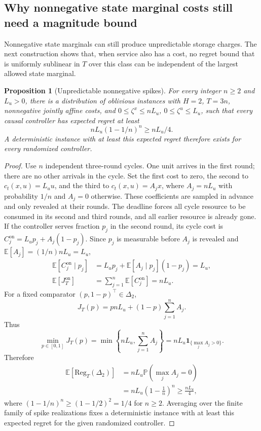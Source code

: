 \documentclass[11pt]{article}
\newcommand{\E}{\mathbb{E}}
\newcommand{\Reg}{\mathrm{Reg}}
\newcommand{\ind}[1]{\mathbf{1}_{\{#1\}}}
\theoremstyle{plain}
\newtheorem{Thm:Proposition}[Thm:Theorem]{Proposition}
\theoremstyle{remark}
\numberwithin{equation}{section}
\begin{document}
\subsection{Why nonnegative state marginal costs still need a magnitude bound}
\label{ch6:subsec:spikes}
Nonnegative state marginals can still produce unpredictable storage
charges. The next construction shows that, when service also has a cost,
no regret bound that is uniformly sublinear in $T$ over this class can be
independent of the largest allowed state marginal.

\begin{Thm:Proposition}[Unpredictable nonnegative spikes]\label{ch6:prop:spikes}
For every integer $n\ge2$ and $L_u>0$, there is a distribution of oblivious
instances with $H=2$, $T=3n$, nonnegative jointly affine costs, and
$0\le\zeta^x\le nL_u$, $0\le\zeta^u\le L_u$, such that every causal
controller has expected regret at least
\begin{equation}\label{ch6:eq:spikes}
 nL_u(1-1/n)^n\ge nL_u/4.
\end{equation}
A deterministic instance with at least this expected regret therefore exists
for every randomized controller.
\end{Thm:Proposition}
\begin{proof}
Use $n$ independent three-round cycles. One unit arrives in the first round;
there are no other arrivals in the cycle. Set the first cost to zero, the
second to $c_t(x,u)=L_uu$, and the third to $c_t(x,u)=A_jx$, where
$A_j=nL_u$ with probability $1/n$ and $A_j=0$ otherwise.
These coefficients are sampled in advance and only revealed at their rounds.
The deadline forces all cycle resource to be consumed in its second and
third rounds, and all earlier resource is already gone.
If the controller serves fraction $p_j$ in the second round, its cycle cost
is $C_j^{\mathrm{on}}=L_up_j+A_j(1-p_j)$.
Since $p_j$ is measurable before $A_j$ is revealed and
$\E[A_j]=(1/n)nL_u=L_u$,
\begin{align*}
\E[C_j^{\mathrm{on}}\mid p_j]
&=L_up_j+\E[A_j\mid p_j](1-p_j)=L_u,\\
\E[J_T^{\mathrm{on}}]&=\sum_{j=1}^{n}\E[C_j^{\mathrm{on}}]=nL_u.
\end{align*}
For a fixed comparator $(p,1-p)^\top\in\Delta_2$,
\[
J_T(p)=pnL_u+(1-p)\sum_{j=1}^{n}A_j.
\]
Thus
\[
\min_{p\in[0,1]}J_T(p)
=\min\left\{nL_u,\sum_{j=1}^{n}A_j\right\}
=nL_u\ind{\max_jA_j>0}.
\]
Therefore
\begin{align*}
\E[\Reg_T(\Delta_2)]
&=nL_u\mathbb P(\max_jA_j=0)\\
&=nL_u\left(1-\frac1n\right)^n
\ge\frac{nL_u}{4},
\end{align*}
where $(1-1/n)^n\ge(1-1/2)^2=1/4$ for $n\ge2$.
Averaging over the finite family of spike realizations fixes a deterministic
instance with at least this expected regret for the given randomized
controller.
\end{proof}
\end{document}
